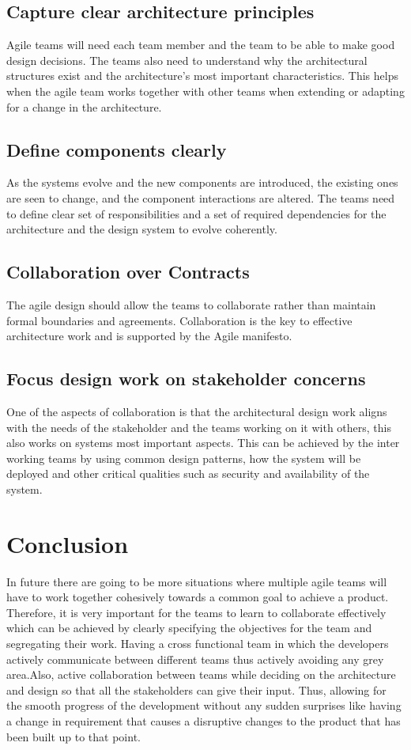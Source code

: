 \documentclass[sigconf]{acmart}
\begin{document}
\subsection{Capture clear architecture principles}
Agile teams will need each team member and the team to be able to make good design decisions. The teams also need to understand why the architectural structures exist and the architecture's most important characteristics. This helps when the agile team works together with other teams when extending or adapting for a change in the architecture.

\subsection{Define components clearly}
As the systems evolve and the new components are introduced, the existing ones are seen to change, and the component interactions are altered. The teams need to define clear set of responsibilities and a set of required dependencies for the architecture and the design system to evolve coherently.

\subsection{Collaboration over Contracts}
The agile design should allow the teams to collaborate rather than maintain formal boundaries and agreements. Collaboration is the key to effective architecture work and is supported by the Agile manifesto.

\subsection{Focus design work on stakeholder concerns}
One of the aspects of collaboration is that the architectural design work aligns with the needs of the stakeholder and the teams working on it with others, this also works on systems most important aspects. This can be achieved by the inter working teams by using common design patterns, how the system will be deployed and other critical qualities such as security and availability of the system.

\section{Conclusion}
In future there are going to be more situations where multiple agile teams will have to work together cohesively towards a common goal to achieve a product. Therefore, it is very important for the teams to learn to collaborate effectively which can be achieved by clearly specifying the objectives for the team and segregating their work. Having a cross functional team in which the developers actively communicate between different teams thus actively avoiding any grey area.Also, active collaboration between teams while deciding on the architecture and design so that all the stakeholders can give their input. Thus, allowing for the smooth progress of the development without any sudden surprises like having a change in requirement that causes a disruptive changes to the product that has been built up to that point.

%

\end{document}
